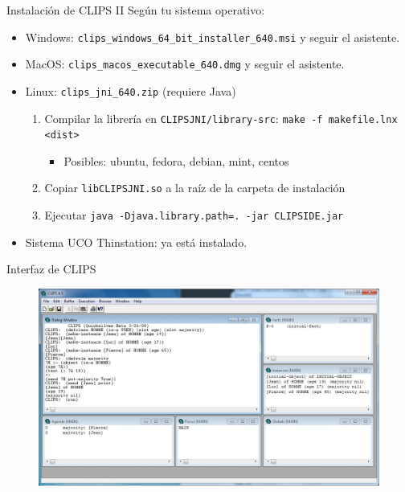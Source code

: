 \documentclass[usenames,dvipsnames,aspectratio=169]{beamer}
\begin{document}
\begin{frame}{Instalación de CLIPS II}
	Según tu sistema operativo:
	\begin{itemize}
		\item Windows: \texttt{clips\_windows\_64\_bit\_installer\_640.msi} y seguir el asistente.
		\item MacOS: \texttt{clips\_macos\_executable\_640.dmg} y seguir el asistente.
		\item Linux: \texttt{clips\_jni\_640.zip} (requiere Java)
		\begin{enumerate}
			\item Compilar la librería en \texttt{CLIPSJNI/library-src}: \texttt{make -f makefile.lnx <dist>}
			\begin{itemize}
				\item Posibles: ubuntu, fedora, debian, mint, centos 
			\end{itemize}
			\item Copiar \texttt{libCLIPSJNI.so} a la raíz de la carpeta de instalación
			\item Ejecutar \texttt{java -Djava.library.path=. -jar CLIPSIDE.jar}
		\end{enumerate}
		\item Sistema UCO Thinstation: ya está instalado.
	\end{itemize}
\end{frame}

\begin{frame}{Interfaz de CLIPS}
	\begin{figure}
		\includegraphics[width=.85\linewidth]{graphics/clips_screen}
	\end{figure}
\end{frame}
\end{document}
